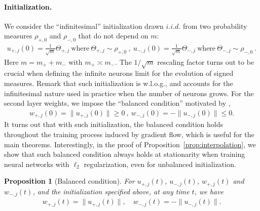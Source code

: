 \documentclass[11pt]{article}
\numberwithin{equation}{section}
\newtheorem{proposition}{Proposition}[section]
\begin{document}
\paragraph{Initialization.} 
We consider the ``infinitesimal'' initialization drawn $i.i.d.$ from two probability measures $\rho_{+, 0}$ and $\rho_{-, 0}$ that do not depend on $m$:
\begin{align}
    u_{+,j}(0) = \frac{1}{\sqrt{m}} \Theta_{+, j}  ~\text{where}~ \Theta_{+, j} \sim \rho_{+, 0} ~ , ~
    u_{-,j}(0) = \frac{1}{\sqrt{m}} \Theta_{-, j}  ~\text{where}~ \Theta_{-, j} \sim \rho_{-, 0} ~.
\end{align} 
Here $m = m_+ + m_-$ with $m_+ \asymp m_-$.
The $1/\sqrt{m}$ rescaling factor turns out to be crucial when defining the infinite neurons limit for the evolution of signed measures. Remark that such initialization is w.l.o.g., and accounts for the infinitesimal nature used in practice when the number of neurons grows. For the second layer weights, we impose the ``balanced condition'' motivated by \cite{maennel2018gradient},
\begin{align}
    w_{+,j}(0) = \|u_{+,j}(0)\|\geq 0 ~,~ w_{-,j}(0) = -\|u_{-,j}(0)\| \leq 0.
\end{align}
It turns out that with such initialization, the balanced condition holds throughout the training process induced by gradient flow, which is useful for the main theorems. Interestingly, in the proof of Proposition~\ref{prop:interpolation}, we show that such balanced condition always holds at stationarity when training neural networks with $\ell_2$ regularization, even for unbalanced initialization.
\begin{proposition}[Balanced condition]\label{lem:balance}
For $u_{+, j}(t)$, $u_{-, j}(t)$, $w_{+, j}(t)$ and $w_{-, j}(t)$, and the initialization specified above, at any time $t$, we have 
\begin{align*}
    w_{+, j}(t) = \|u_{+, j}(t)\|, \quad
    w_{-, j}(t) = -\|u_{-, j}(t)\|.
\end{align*}
\end{proposition}


        
\end{document}
